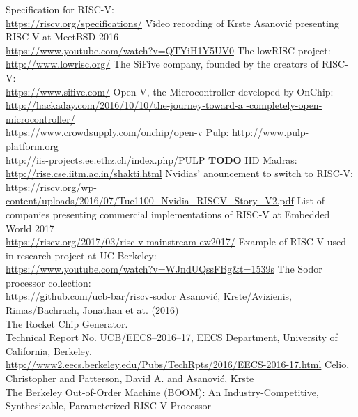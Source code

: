 \documentclass[journal,a4paper]{IEEEtran}
\begin{document}
\begin{thebibliography}{1}
		Specification for RISC-V:\\
		\url{https://riscv.org/specifications/}
		Video recording of Krste Asanović presenting RISC-V at MeetBSD 2016\\
		\url{https://www.youtube.com/watch?v=QTYiH1Y5UV0}
		The lowRISC project:\\
		\url{http://www.lowrisc.org/}
		The SiFive company, founded by the creators of RISC-V:\\
		\url{https://www.sifive.com/}
		Open-V, the Microcontroller developed by OnChip:\\
		\url{http://hackaday.com/2016/10/10/the-journey-toward-a -completely-open-microcontroller/}\\
		\url{https://www.crowdsupply.com/onchip/open-v}
		Pulp: \url{http://www.pulp-platform.org}\\
		\url{http://iis-projects.ee.ethz.ch/index.php/PULP}
		\textbf{TODO} IID Madras:\\
		\url{http://rise.cse.iitm.ac.in/shakti.html}
		Nvidias' anouncement to switch to RISC-V:\\
		\url{https://riscv.org/wp-content/uploads/2016/07/Tue1100_Nvidia_RISCV_Story_V2.pdf}
		List of companies presenting commercial implementations of \mbox{RISC-V} at Embedded World 2017\\
		\url{https://riscv.org/2017/03/risc-v-mainstream-ew2017/}
		Example of RISC-V used in research project at UC Berkeley:\\
		\url{https://www.youtube.com/watch?v=WJndUQssFBg&t=1539s}
		The Sodor processor collection:\\
		\url{https://github.com/ucb-bar/riscv-sodor}
		Asanović, Krste/Avizienis, Rimas/Bachrach, Jonathan et at. (2016)\\
		The Rocket Chip Generator.\\
		Technical Report No. UCB/EECS--2016--17, EECS Department, University of California, Berkeley.\\
		\url{http://www2.eecs.berkeley.edu/Pubs/TechRpts/2016/EECS-2016-17.html}
		Celio, Christopher and Patterson, David A. and Asanović, Krste\\
		The Berkeley Out-of-Order Machine (BOOM): An Industry-Competitive, Synthesizable, Parameterized RISC-V Processor\\

\end{thebibliography}
\end{document}
